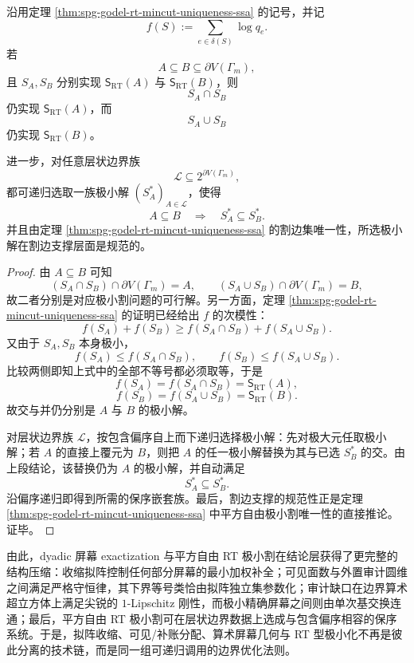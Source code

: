 \begin{theorem}\label{thm:conclusion-squarefree-rt-laminar-nesting}
沿用定理 \ref{thm:spg-godel-rt-mincut-uniqueness-ssa} 的记号，并记
\[
f(S):=\sum_{e\in\delta(S)}\log q_e.
\]
若
\[
A\subseteq B\subseteq \partial V(\Gamma_m),
\]
且 \(S_A,S_B\) 分别实现 \(\mathsf S_{\mathrm{RT}}(A)\) 与 \(\mathsf S_{\mathrm{RT}}(B)\)，则
\[
S_A\cap S_B
\]
仍实现 \(\mathsf S_{\mathrm{RT}}(A)\)，而
\[
S_A\cup S_B
\]
仍实现 \(\mathsf S_{\mathrm{RT}}(B)\)。

进一步，对任意层状边界族
\[
\mathcal L\subseteq 2^{\partial V(\Gamma_m)},
\]
都可递归选取一族极小解 \((S_A^\ast)_{A\in\mathcal L}\)，使得
\[
A\subseteq B
\quad\Longrightarrow\quad
S_A^\ast\subseteq S_B^\ast.
\]
并且由定理 \ref{thm:spg-godel-rt-mincut-uniqueness-ssa} 的割边集唯一性，所选极小解在割边支撑层面是规范的。
\end{theorem}
\begin{proof}
由 \(A\subseteq B\) 可知
\[
(S_A\cap S_B)\cap \partial V(\Gamma_m)=A,
\qquad
(S_A\cup S_B)\cap \partial V(\Gamma_m)=B,
\]
故二者分别是对应极小割问题的可行解。另一方面，定理 \ref{thm:spg-godel-rt-mincut-uniqueness-ssa} 的证明已经给出 \(f\) 的次模性：
\[
f(S_A)+f(S_B)\ge f(S_A\cap S_B)+f(S_A\cup S_B).
\]
又由于 \(S_A,S_B\) 本身极小，
\[
f(S_A)\le f(S_A\cap S_B),
\qquad
f(S_B)\le f(S_A\cup S_B).
\]
比较两侧即知上式中的全部不等号都必须取等，于是
\[
f(S_A)=f(S_A\cap S_B)=\mathsf S_{\mathrm{RT}}(A),
\]
\[
f(S_B)=f(S_A\cup S_B)=\mathsf S_{\mathrm{RT}}(B).
\]
故交与并仍分别是 \(A\) 与 \(B\) 的极小解。

对层状边界族 \(\mathcal L\)，按包含偏序自上而下递归选择极小解：先对极大元任取极小解；若 \(A\) 的直接上覆元为 \(B\)，则把 \(A\) 的任一极小解替换为其与已选 \(S_B^\ast\) 的交。由上段结论，该替换仍为 \(A\) 的极小解，并自动满足
\[
S_A^\ast\subseteq S_B^\ast.
\]
沿偏序递归即得到所需的保序嵌套族。最后，割边支撑的规范性正是定理 \ref{thm:spg-godel-rt-mincut-uniqueness-ssa} 中平方自由极小割唯一性的直接推论。证毕。
\end{proof}

\noindent
由此，dyadic 屏幕 exactization 与平方自由 RT 极小割在结论层获得了更完整的结构压缩：收缩拟阵控制任何部分屏幕的最小加权补全；可见面数与外置审计圆维之间满足严格守恒律，其下界等号类恰由拟阵独立集参数化；审计缺口在边界算术超立方体上满足尖锐的 \(1\)-Lipschitz 刚性，而极小精确屏幕之间则由单次基交换连通；最后，平方自由 RT 极小割可在层状边界数据上选成与包含偏序相容的保序系统。于是，拟阵收缩、可见/补账分配、算术屏幕几何与 RT 型极小化不再是彼此分离的技术链，而是同一组可递归调用的边界优化法则。

\endinput
